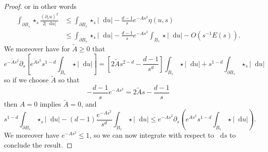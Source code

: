 \documentclass[reqno,10pt]{amsart}
\newcommand*\dif{\mathop{}\!\mathrm{d}}
\theoremstyle{definition}
\numberwithin{equation}{section}
\begin{document}
\begin{proof}
or in other words
\begin{align*}
\int_{\partial B_s} \star_s \frac{(\partial_r u)^2}{2|\dif u|} &\leq \int_{\partial B_s} \star_s |\dif u| - \frac{d - 1}{s} e^{-As^2} \eta(u, s)\\
&\leq \int_{\partial B_s} \star_s |\dif u| - \frac{d - 1}{s} e^{-As^2} \int_{B_s} \star |\dif u| - O(s^{-1}E(s)).
\end{align*}
We moreover have for $\tilde A \geq 0$ that
$$e^{-\tilde As^2} \partial_s \left[e^{\tilde As^2} s^{1 - d} \int_{B_s} \star |\dif u|\right] = \left[2\tilde As^{2 - d} - \frac{d - 1}{s^d}\right]\int_{B_s} \star |\dif u| + s^{1 - d} \int_{\partial B_s} \star_s |\dif u|$$
so if we choose $\tilde A$ so that
$$-\frac{d - 1}{s} e^{-As^2} = 2\tilde As - \frac{d - 1}{s}$$
then $A = 0$ implies $\tilde A = 0$, and
$$s^{1 - d} \int_{\partial B_s} \star_s |\dif u| - (d - 1)\frac{e^{-As^2}}{s^d} \int_{B_s} \star|\dif u| \leq e^{-As^2} \partial_s\left(e^{As^2} s^{1 - d} \int_{B_s} \star|\dif u|\right).$$
We moreover have $e^{-As^2} \leq 1$, so we can now integrate with respect to $\dif s$ to conclude the result.
\end{proof}
\end{document}
